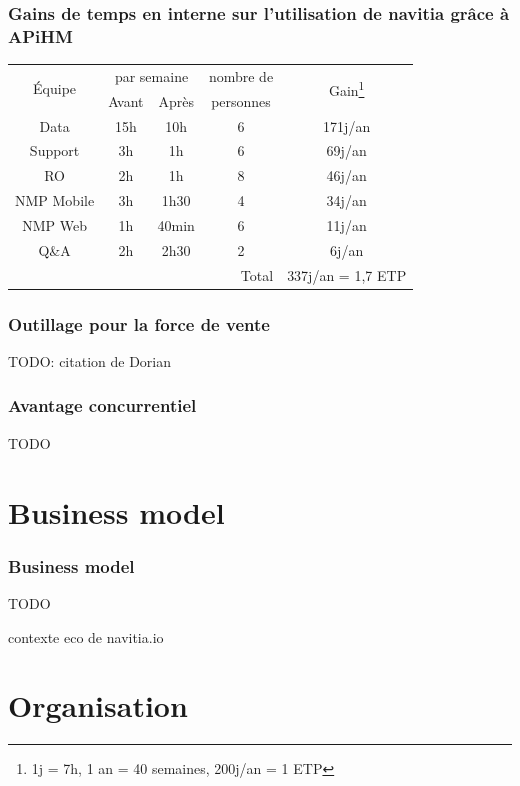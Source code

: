 \documentclass[table]{beamer}
\begin{document}
\begin{frame}
  \frametitle{Gains de temps en interne sur l'utilisation de navitia
    grâce à APiHM}

  \centering

  \begin{tabular}{|c|c|c|c|c|}
    \hline
    \multirow{2}{*}{Équipe}& \multicolumn{2}{c|}{par
      semaine}&nombre de&\multirow{2}{*}{Gain\footnote{1j = 7h,
        1 an = 40 semaines, 200j/an = 1 ETP}}\\
    \hhline{~--~~}
    & Avant & Après & personnes &\\
    \hline
    Data       &15h &10h & 6 & 171j/an\\
    Support    & 3h & 1h & 6 &  69j/an\\
    RO         & 2h & 1h & 8 &  46j/an\\
    NMP Mobile & 3h &1h30& 4 &  34j/an\\
    NMP Web    & 1h &40min&6 &  11j/an\\
    Q\&A       & 2h &2h30& 2 &   6j/an\\
    \hline
    \multicolumn{4}{|r|}{Total} &
    337j/an = 1{,}7 ETP\\
    \hline
  \end{tabular}
\end{frame}

\begin{frame}
  \frametitle{Outillage pour la force de vente}

  TODO: citation de Dorian
\end{frame}

\begin{frame}
  \frametitle{Avantage concurrentiel}

  TODO
\end{frame}

\section{Business model}

\begin{frame}
  \frametitle{Business model}

  TODO

  contexte eco de navitia.io
\end{frame}

\section{Organisation}
\end{document}
